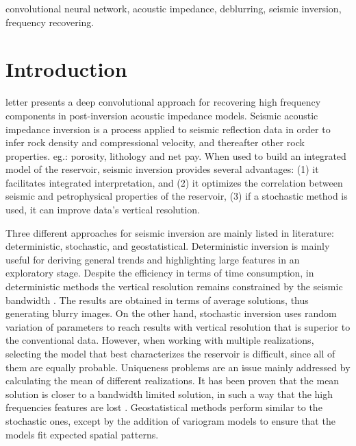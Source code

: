 \documentclass[journal]{IEEEtran}
\begin{document}
\begin{IEEEkeywords}
convolutional neural network, acoustic impedance, deblurring, seismic inversion, frequency recovering.
\end{IEEEkeywords}

\IEEEpeerreviewmaketitle



\section{Introduction}

 letter presents a deep convolutional
approach for recovering high frequency components in
post-inversion acoustic impedance models.
Seismic acoustic impedance inversion is a process applied to 
seismic reflection data in order to infer rock density and 
compressional velocity, and thereafter other rock properties.
eg.: porosity, lithology and net pay. When used to build an
integrated model of the reservoir, seismic inversion provides
several advantages: (1) it facilitates integrated interpretation, 
and (2) it optimizes the correlation between seismic and petrophysical
properties of the reservoir, (3) if a stochastic method is used,
it can improve data's vertical resolution.

Three different approaches for seismic inversion are mainly listed in 
literature: deterministic, stochastic, and 
geostatistical. Deterministic inversion is mainly useful for deriving general
trends and highlighting large features in an exploratory stage.
Despite the efficiency in terms of time consumption,
in deterministic methods the vertical resolution remains
constrained by the seismic bandwidth \cite{Sancevero2005}.
The results are obtained in terms of average solutions, thus generating
blurry images. On the other hand, stochastic inversion uses random variation
of parameters to reach results with vertical resolution that is
superior to the conventional data. However, when working with multiple
realizations, selecting the model that best characterizes the
reservoir is difficult, since all of them are equally probable.
Uniqueness problems are an issue mainly addressed by calculating
the mean of different realizations. It has been proven
that the mean solution is closer to a bandwidth limited solution,
in such a way that the high frequencies features are lost
\cite{Cook2010}. Geostatistical methods perform similar
to the stochastic ones, except by the addition of variogram models
to ensure that the models fit expected spatial patterns.
\end{document}
